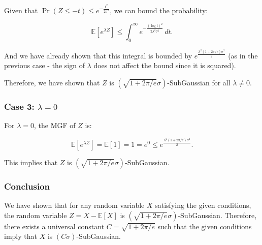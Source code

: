 \documentclass[a4 paper]{article}
\theoremstyle{boldStyle}
\theoremstyle{boldBlueStyle}
\theoremstyle{boldPurpleStyle}
\theoremstyle{boldRedStyle}
\begin{document}
Given that \(\Pr(Z \leq -t) \leq e^{-\frac{t^2}{2\sigma^2}}\), we can bound the probability:

\[
\mathbb{E}[e^{\lambda Z}] \leq \int_0^\infty e^{-\frac{(\log t)^2}{2\lambda^2 \sigma^2}} \, dt.
\]

And we have already shown that this integral is bounded by \(e^{\frac{\lambda^2 (1 + 2\pi/e) \sigma^2}{2}}\) 
(as in the previous case - the sign of \(\lambda\) does not affect the bound since it is squared).

Therefore, we have shown that \(Z\) is \((\sqrt{1 + 2\pi/e} \sigma)\)-SubGaussian for all \(\lambda \neq 0\).


\subsubsection*{Case 3: \(\lambda = 0\)}

For \(\lambda = 0\), the MGF of \(Z\) is:

\[
\mathbb{E}[e^{\lambda Z}] = \mathbb{E}[1] = 1 = e^0 \leq e^{\frac{\lambda^2 (1 + 2\pi/e) \sigma^2}{2}}.
\]

This implies that \(Z\) is \((\sqrt{1 + 2\pi/e} \sigma)\)-SubGaussian.


\subsubsection*{Conclusion}

We have shown that for any random variable \(X\) satisfying the given conditions, the random variable \(Z = X - \mathbb{E}[X]\) is \((\sqrt{1 + 2\pi/e} \sigma)\)-SubGaussian. 
Therefore, there exists a universal constant \(C = \sqrt{1 + 2\pi/e}\) such that the given conditions imply that \(X\) is \((C\sigma)\)-SubGaussian.
\end{document}
